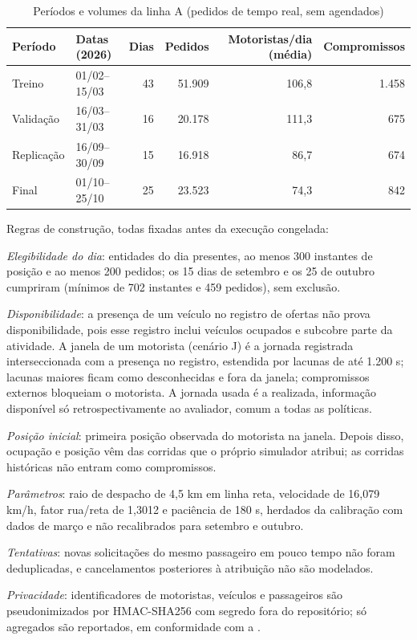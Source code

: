\begin{table}[!htb]
\caption{Períodos e volumes da linha A (pedidos de tempo real, sem agendados)}\label{tab:periodos}
\centering\fontetabela
\begin{tabular}{@{}llrrrr@{}}
\toprule
Período & Datas (2026) & Dias & Pedidos & Motoristas/dia (média) & Compromissos \\
\midrule
Treino & 01/02--15/03 & 43 & 51.909 & 106,8 & 1.458 \\
Validação & 16/03--31/03 & 16 & 20.178 & 111,3 & 675 \\
Replicação & 16/09--30/09 & 15 & 16.918 & 86,7 & 674 \\
Final & 01/10--25/10 & 25 & 23.523 & 74,3 & 842 \\
\bottomrule
\end{tabular}
\end{table}

Regras de construção, todas fixadas antes da execução congelada:
\begin{alineas}
\item \textit{Elegibilidade do dia}: entidades do dia presentes, ao menos 300 instantes de posição e ao menos 200 pedidos; os 15 dias de setembro e os 25 de outubro cumpriram (mínimos de 702 instantes e 459 pedidos), sem exclusão.
\item \textit{Disponibilidade}: a presença de um veículo no registro de ofertas não prova disponibilidade, pois esse registro inclui veículos ocupados e subcobre parte da atividade. A janela de um motorista (cenário J) é a jornada registrada interseccionada com a presença no registro, estendida por lacunas de até 1.200 s; lacunas maiores ficam como desconhecidas e fora da janela; compromissos externos bloqueiam o motorista. A jornada usada é a realizada, informação disponível só retrospectivamente ao avaliador, comum a todas as políticas.
\item \textit{Posição inicial}: primeira posição observada do motorista na janela. Depois disso, ocupação e posição vêm das corridas que o próprio simulador atribui; as corridas históricas não entram como compromissos.
\item \textit{Parâmetros}: raio de despacho de 4,5 km em linha reta, velocidade de 16,079 km/h, fator rua/reta de 1,3012 e paciência de 180 s, herdados da calibração com dados de março e não recalibrados para setembro e outubro.
\item \textit{Tentativas}: novas solicitações do mesmo passageiro em pouco tempo não foram deduplicadas, e cancelamentos posteriores à atribuição não são modelados.
\item \textit{Privacidade}: identificadores de motoristas, veículos e passageiros são pseudonimizados por HMAC-SHA256 com segredo fora do repositório; só agregados são reportados, em conformidade com a .
\end{alineas}

